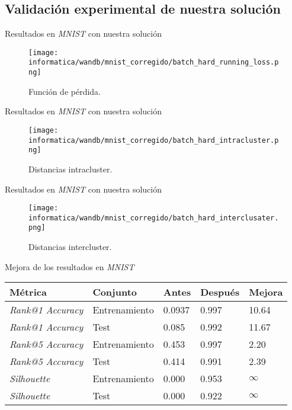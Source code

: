 \subsection{Validación experimental de nuestra solución}
\begin{frame}{Resultados en \textit{MNIST} con nuestra solución}

	\begin{figure}
		\texttt{[image: informatica/wandb/mnist\_corregido/batch\_hard\_running\_loss.png]}
		\caption{Función de pérdida.}
	\end{figure}
\end{frame}

\begin{frame}{Resultados en \textit{MNIST} con nuestra solución}

	\begin{figure}
		\texttt{[image: informatica/wandb/mnist\_corregido/batch\_hard\_intracluster.png]}
		\caption{Distancias intracluster.}
	\end{figure}

\end{frame}

\begin{frame}{Resultados en \textit{MNIST} con nuestra solución}


	\begin{figure}
		\texttt{[image: informatica/wandb/mnist\_corregido/batch\_hard\_interclusater.png]}
		\caption{Distancias intercluster.}
	\end{figure}


\end{frame}

\begin{frame}{Mejora de los resultados en \textit{MNIST}}


	\begin{table}
		\centering
		\begin{tabular}{|l|l|l|l|l|}
			\hline
			Métrica                  & Conjunto      & Antes  & Después & Mejora   \\
			\hline
			\textit{Rank@1 Accuracy} & Entrenamiento & 0.0937 & 0.997   & 10.64    \\
			\textit{Rank@1 Accuracy} & Test          & 0.085  & 0.992   & 11.67    \\
			\textit{Rank@5 Accuracy} & Entrenamiento & 0.453  & 0.997   & 2.20     \\
			\textit{Rank@5 Accuracy} & Test          & 0.414  & 0.991   & 2.39     \\
			\textit{Silhouette}      & Entrenamiento & 0.000  & 0.953   & $\infty$ \\
			\textit{Silhouette}      & Test          & 0.000  & 0.922   & $\infty$ \\
			\hline
		\end{tabular}
		\label{table:comparaciones_mnist_resultados}
	\end{table}
\end{frame}


